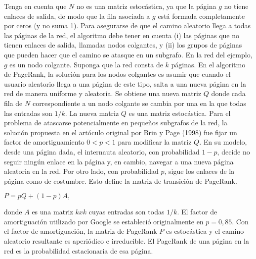 \begin{ejer}
    \par Tenga en cuenta que $N$ no es una matriz estocástica, ya que la página $g$ no tiene enlaces de salida, 
    de modo que la fila asociada a $g$ está formada completamente por ceros (y no suma 1). 
    Para asegurarse de que el camino aleatorio llega a todas las páginas de la red, el algoritmo debe tener en cuenta (i) 
    las páginas que no tienen enlaces de salida, llamadas nodos colgantes, y (ii) los grupos de páginas que pueden hacer que el camino se atasque en un subgrafo. 
    En la red del ejemplo, $g$ es un nodo colgante. Suponga que la red consta de $k$ páginas. En el algoritmo de PageRank, la solución para los nodos colgantes es 
    asumir que cuando el usuario aleatorio llega a una página de este tipo, salta a una nueva página en la red de manera uniforme y aleatoria.
    Se obtiene una nueva matriz $Q$ donde cada fila de $N$ correspondiente a un nodo colgante se cambia por una en la que todas las entradas son $1/k$. 
    La nueva matriz $Q$ es una matriz estocástica. Para el problema de atascarse potencialmente en pequeños subgrafos de la red, la solución propuesta en el 
    artóculo original por Brin y Page (1998) fue fijar un factor de amortiguamiento $0 < p < 1$ para modificar la matriz $Q$. En su modelo, desde una página dada, 
    el internauta aleatorio, con probabilidad $1 - p$, decide no seguir ningún enlace en la página y, en cambio, navegar a una nueva página aleatoria en la red.
    Por otro lado, con probabilidad $p$, sigue los enlaces de la página como de costumbre. Esto define la matriz de transición de PageRank.
    \par $P =pQ+(1-p)A,$
    \par donde $A$ es una matriz $k x k$ cuyas entradas son todas $1/k$. El factor de amortiguación utilizado por Google se estableció originalmente en $p = 0,85$. 
    Con el factor de amortiguación, la matriz de PageRank $P$ es estocástica y el camino aleatorio resultante es aperiódico e irreducible. 
    El PageRank de una página en la red es la probabilidad estacionaria de esa página.
\end{ejer}